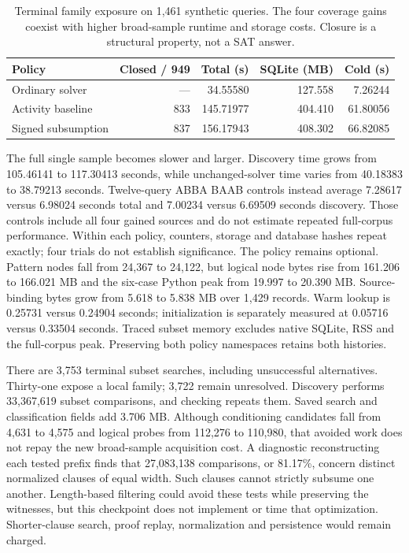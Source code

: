 \documentclass[11pt,a4paper]{article}
\numberwithin{equation}{section}
\theoremstyle{plain}
\theoremstyle{definition}
\theoremstyle{remark}
\begin{document}
\begin{table}[htbp]
\centering
\small
\begin{tabular}{lrrrr}
\hline
Policy & Closed / 949 & Total (s) & SQLite (MB) & Cold (s) \\
\hline
Ordinary solver & --- & 34.55580 & 127.558 & 7.26244 \\
Activity baseline & 833 & 145.71977 & 404.410 & 61.80056 \\
Signed subsumption & 837 & 156.17943 & 408.302 & 66.82085 \\
\hline
\end{tabular}
\caption{Terminal family exposure on 1,461 synthetic queries. The four coverage gains coexist with higher broad-sample runtime and storage costs. Closure is a structural property, not a SAT answer.}
\label{tab:signed-subsumption}
\end{table}

The full single sample becomes slower and larger. Discovery time grows from 105.46141 to 117.30413 seconds, while unchanged-solver time varies from 40.18383 to 38.79213 seconds. Twelve-query ABBA BAAB controls instead average 7.28617 versus 6.98024 seconds total and 7.00234 versus 6.69509 seconds discovery. Those controls include all four gained sources and do not estimate repeated full-corpus performance. Within each policy, counters, storage and database hashes repeat exactly; four trials do not establish significance. The policy remains optional. Pattern nodes fall from 24,367 to 24,122, but logical node bytes rise from 161.206 to 166.021 MB and the six-case Python peak from 19.997 to 20.390 MB. Source-binding bytes grow from 5.618 to 5.838 MB over 1,429 records. Warm lookup is 0.25731 versus 0.24904 seconds; initialization is separately measured at 0.05716 versus 0.33504 seconds. Traced subset memory excludes native SQLite, RSS and the full-corpus peak. Preserving both policy namespaces retains both histories.

There are 3,753 terminal subset searches, including unsuccessful alternatives. Thirty-one expose a local family; 3,722 remain unresolved. Discovery performs 33,367,619 subset comparisons, and checking repeats them. Saved search and classification fields add 3.706 MB. Although conditioning candidates fall from 4,631 to 4,575 and logical probes from 112,276 to 110,980, that avoided work does not repay the new broad-sample acquisition cost. A diagnostic reconstructing each tested prefix finds that 27,083,138 comparisons, or 81.17\%, concern distinct normalized clauses of equal width. Such clauses cannot strictly subsume one another. Length-based filtering could avoid these tests while preserving the witnesses, but this checkpoint does not implement or time that optimization. Shorter-clause search, proof replay, normalization and persistence would remain charged.
\end{document}
